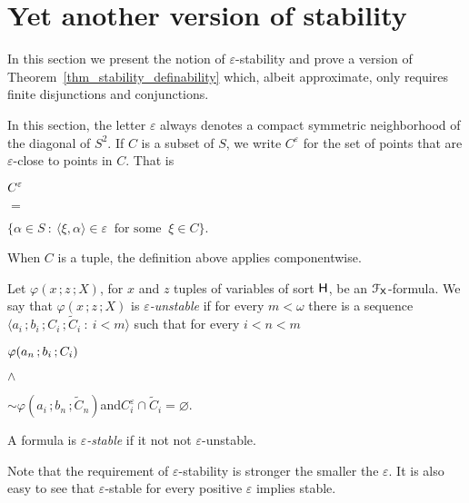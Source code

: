 \section{Yet another version of stability}
\def\medrel#1{\parbox{5ex}{\hfil $#1$}}
\def\ceq#1#2#3{\parbox[t]{28ex}{$\displaystyle #1$}\medrel{#2}{$\displaystyle #3$}}

In this section we present the notion of $\varepsilon$-stability and prove a version of Theorem~\ref{thm_stability_definability} which, albeit approximate,  only requires finite disjunctions and conjunctions.

In this section, the letter $\varepsilon$ always denotes a compact symmetric neighborhood of the diagonal of $S^2$.
If $C$ is a subset of $S$, we write $C^\varepsilon$ for the set of points that are $\varepsilon$-close to points in $C$.
That is

\ceq{\hfill C^\varepsilon}{=}{\big\{\alpha\in S\ :\ \langle\xi,\alpha\rangle\in \varepsilon\ \text{ for some }\ \xi\in C\big\}.}

When $C$ is a tuple, the definition above applies componentwise.

\begin{definition}\label{def_epsilon_stable}\strut
  Let $\varphi(x\,;z\,;X)$, for $x$ and $z$ tuples of variables of sort ${\sf H}$, be an ${\EuScript F}_{\sf X}$-for\-mu\-la.
  We say that $\varphi(x\,;z\,;X)$ is \emph{$\varepsilon$-unstable\/} if for every $m<\omega$ there is a sequence $\langle a_i\,;b_i\,;C_i\,;\tilde C_i\ :\ i<m\rangle$ such that for every $i<n<m$\smallskip

    \ceq{\hfill \varphi(a_n\,;b_i\,;C_i)}{\wedge}{{\sim}\varphi(a_i\,;b_n\,;\tilde C_n)}\quad and\quad $C_i^\varepsilon\cap\tilde C_i=\varnothing$.\smallskip

  A formula is \emph{$\varepsilon$-stable\/} if it not not $\varepsilon$-unstable.  
\end{definition}

Note that the requirement of $\varepsilon$-stability is stronger the smaller the $\varepsilon$.
It is also easy to see that $\varepsilon$-stable for every positive $\varepsilon$ implies stable.

